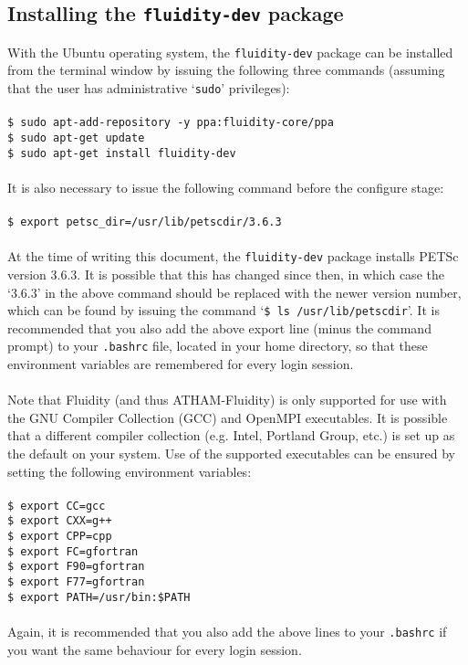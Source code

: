 \documentclass[10pt,a4paper]{article}
\newcommand\tab[1][0.5cm]{\hspace*{#1}}
\begin{document}
\subsection{Installing the \texttt{fluidity-dev} package} \label{FluidityDev}
With the Ubuntu operating system, the \texttt{fluidity-dev} package can be installed from the terminal window by issuing the following three commands (assuming that the user has administrative `\texttt{sudo}' privileges):\\\\
\tab \texttt{\$ sudo apt-add-repository -y ppa:fluidity-core/ppa}\\
\tab \texttt{\$ sudo apt-get update}\\
\tab \texttt{\$ sudo apt-get install fluidity-dev}\\\\
It is also necessary to issue the following command before the configure stage:\\\\
\tab \texttt{\$ export petsc\_dir=/usr/lib/petscdir/3.6.3}\\\\
At the time of writing this document, the \texttt{fluidity-dev} package installs PETSc version 3.6.3. It is possible that this has changed since then, in which case the `3.6.3' in the above command should be replaced with the newer version number, which can be found by issuing the command `\texttt{\$ ls /usr/lib/petscdir}'. It is recommended that you also add the above export line (minus the command prompt) to your \texttt{.bashrc} file, located in your home directory, so that these environment variables are remembered for every login session.\\\\
Note that Fluidity (and thus ATHAM-Fluidity) is only supported for use with the GNU Compiler Collection (GCC) and OpenMPI executables. It is possible that a different compiler collection (e.g. Intel, Portland Group, etc.) is set up as the default on your system. Use of the supported executables can be ensured by setting the following environment variables:\\\\
\tab \texttt{\$ export CC=gcc}\\
\tab \texttt{\$ export CXX=g++}\\
\tab \texttt{\$ export CPP=cpp}\\
\tab \texttt{\$ export FC=gfortran}\\
\tab \texttt{\$ export F90=gfortran}\\
\tab \texttt{\$ export F77=gfortran}\\
\tab \texttt{\$ export PATH=/usr/bin:\$PATH}\\\\
Again, it is recommended that you also add the above lines to your \texttt{.bashrc} if you want the same behaviour for every login session.
\end{document}
